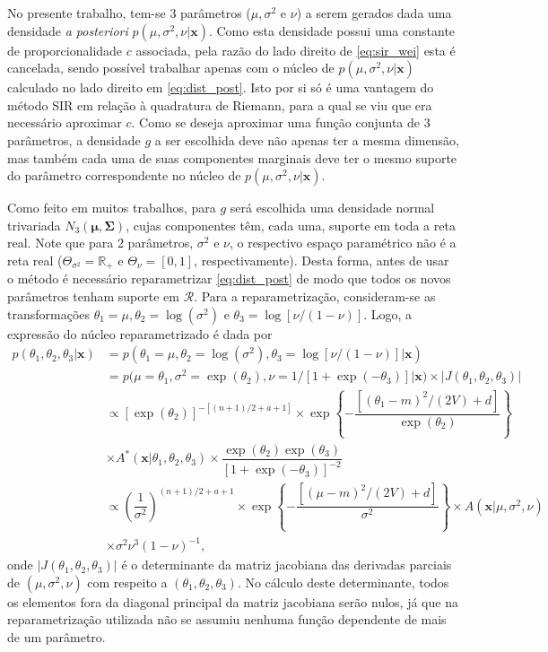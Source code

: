 No presente trabalho, tem-se 3 parâmetros ($\mu, \sigma^2$ e $\nu$) a serem gerados dada uma densidade \textit{a posteriori} $p(\mu, \sigma^2, \nu | \bm{x})$. Como esta densidade possui uma constante de proporcionalidade $c$ associada, pela razão do lado direito de \eqref{eq:sir_wei} esta é cancelada, sendo possível trabalhar apenas com o núcleo de $p(\mu, \sigma^2, \nu | \bm{x})$ calculado no lado direito em \eqref{eq:dist_post}. Isto por si só é uma vantagem do método SIR em relação à quadratura de Riemann, para a qual se viu que era necessário aproximar $c$. Como se deseja aproximar uma função conjunta de 3 parâmetros, a densidade $g$ a ser escolhida deve não apenas ter a mesma dimensão, mas também cada uma de suas componentes marginais deve ter o mesmo suporte do parâmetro correspondente no núcleo de $p(\mu, \sigma^2, \nu | \bm{x})$.

Como feito em muitos trabalhos, para $g$ será escolhida uma densidade normal trivariada $N_3(\bm{\mu}, \bm{\Sigma})$, cujas componentes têm, cada uma, suporte em toda a reta real. Note que para 2 parâmetros, $\sigma^2$ e $\nu$, o respectivo espaço paramétrico não é a reta real ($\Theta_{\sigma^2} = \mathbb{R}_+$ e $\Theta_{\nu} = [0,1]$, respectivamente). Desta forma, antes de usar o método é necessário reparametrizar \eqref{eq:dist_post} de modo que todos os novos parâmetros tenham suporte em $\mathcal{R}$. Para a reparametrização, consideram-se as transformações $\theta_1 = \mu, \theta_2 = \log(\sigma^2)$ e $\theta_3 = \log[\nu/(1-\nu)]$. Logo, a expressão do núcleo reparametrizado é dada por
\begin{align}
p(\theta_1, \theta_2, \theta_3 | \bm{x})
&= p(\theta_1 = \mu, \theta_2 = \log(\sigma^2), \theta_3 = \log[\nu/(1-\nu)] | \bm{x}) \nonumber \\
&= p(\mu = \theta_1, \sigma^2 = \exp(\theta_2), \nu = 1/[1 + \exp(-\theta_3)] | \bm{x}) \times |J(\theta_1, \theta_2, \theta_3)| \nonumber \\
&\propto \left[\exp(\theta_2)\right]^{-[(n + 1)/2 + a + 1]} \times \exp\left\{-\dfrac{\left[(\theta_1 - m)^2 / (2V) + d\right]}{\exp(\theta_2)}\right\} \nonumber \\
&\times A^*(\bm{x} | \theta_1, \theta_2, \theta_3) \times  \dfrac{\exp(\theta_2) \exp(\theta_3)}{\left[1 + \exp(-\theta_3)\right]^{-2}} \nonumber \\
&\propto \left(\dfrac{1}{\sigma^2}\right)^{(n + 1)/2 + a + 1} \times \exp\left\{-\dfrac{\left[(\mu - m)^2 / (2V) + d\right]}{\sigma^2}\right\} \times A(\bm{x} | \mu, \sigma^2, \nu) \nonumber \\
&\times \sigma^2 \nu^3(1-\nu)^{-1}, \label{eq:sir_dpre}
\end{align}
onde $|J(\theta_1, \theta_2, \theta_3)|$ é o determinante da matriz jacobiana das derivadas parciais de $(\mu, \sigma^2, \nu)$ com respeito a $(\theta_1, \theta_2, \theta_3)$. No cálculo deste determinante, todos os elementos fora da diagonal principal da matriz jacobiana serão nulos, já que na reparametrização utilizada não se assumiu nenhuma função dependente de mais de um parâmetro.

